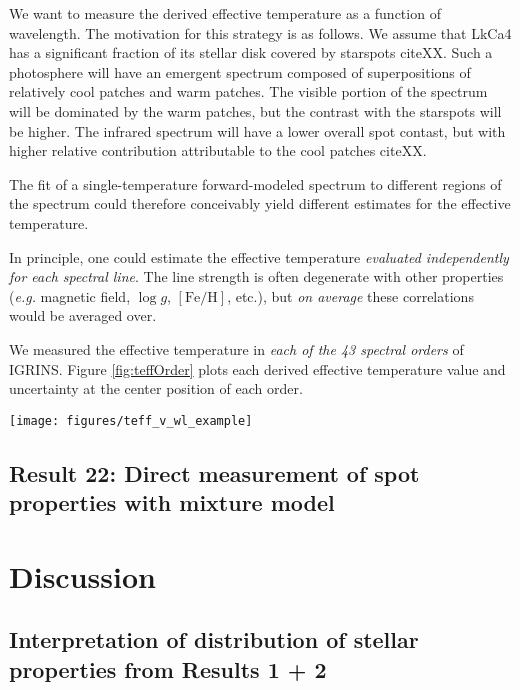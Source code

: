 \documentclass[onecolumn]{emulateapj}%
\begin{document}
We want to measure the derived effective temperature as a function of wavelength.  The motivation for this strategy is as follows.  We assume that LkCa4 has a significant fraction of its stellar disk covered by starspots citeXX.  Such a photosphere will have an emergent spectrum composed of superpositions of relatively cool patches and warm patches.  The visible portion of the spectrum will be dominated by the warm patches, but the contrast with the starspots will be higher.  The infrared spectrum will have a lower overall spot contast, but with higher relative contribution attributable to the cool patches citeXX.  

The fit of a single-temperature forward-modeled spectrum to different regions of the spectrum could therefore conceivably yield different estimates for the effective temperature.

In principle, one could estimate the effective temperature \emph{evaluated independently for each spectral line}.  The line strength is often degenerate with other properties (\emph{e.g.} magnetic field, $\log{g}$, $[\mathrm{Fe}/\mathrm{H}]$, etc.), but \emph{on average} these correlations would be averaged over.

We measured the effective temperature in \emph{each of the 43 spectral orders} of IGRINS.  Figure \ref{fig:teffOrder} plots each derived effective temperature value and uncertainty at the center position of each order.

\begin{figure*}
	\centering
	\texttt{[image: figures/teff\_v\_wl\_example]} 
	\caption{Effective temperature as derived by different orders.}
	\label{fig:teffOrder}
\end{figure*}

\subsection{Result 22: Direct measurement of spot properties with mixture model}

\section{Discussion}

\subsection{Interpretation of distribution of stellar properties from Results 1 + 2}
\end{document}
